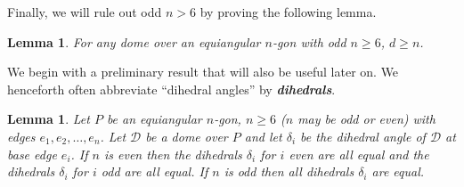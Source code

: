 \documentclass[11pt]{article}
\newcommand{\ABox}{
\raisebox{3pt}{\framebox[6pt]{\rule{6pt}{0pt}}}
}
\newenvironment{proof}{{\bf Proof:}}{\hfill\ABox\medskip}
\newtheorem{lemma}[theorem]{Lemma}
\newcommand{\lemref}[1]{\ref{lemma:#1}}
\def\D{{\mathcal D}}
\def\d{{\delta}}
\def\defn#1{\textit{\textbf{\boldmath #1}}}
\newcommand{\JOR}[1]{{\color{red} JOR: [#1]}}
\newcommand{\Anna}[1]{{\color{red} Anna: [#1]}}
\newcommand{\anna}[1]{{\color{blue} #1}}
\begin{document}
Finally, we will rule out odd $n > 6$ by proving the following lemma.

\begin{lemma}
\label{lem:all-down}
For any
dome over an equiangular $n$-gon with odd $n \ge 6$, %
$d \ge n$.
\end{lemma}



We begin with a preliminary result that will also be useful later on.
%
We henceforth often abbreviate ``dihedral angles'' by \defn{dihedrals}.
\begin{lemma}
\label{lem:dihedrals}
Let $P$ be an equiangular $n$-gon, $n \ge 6$ ($n$ may be odd or even) with edges $e_1, e_2, \ldots, e_n$.
Let $\D$ be a dome over $P$ and let $\d_i$ be the dihedral angle of $\D$ at base edge $e_i$.
If $n$ is even then the dihedrals $\d_i$ for $i$ even are all equal and the dihedrals $\d_i$ for $i$ odd are all equal.  If $n$ is odd then all dihedrals $\d_i$ are equal.
\end{lemma}
%
\end{document}
